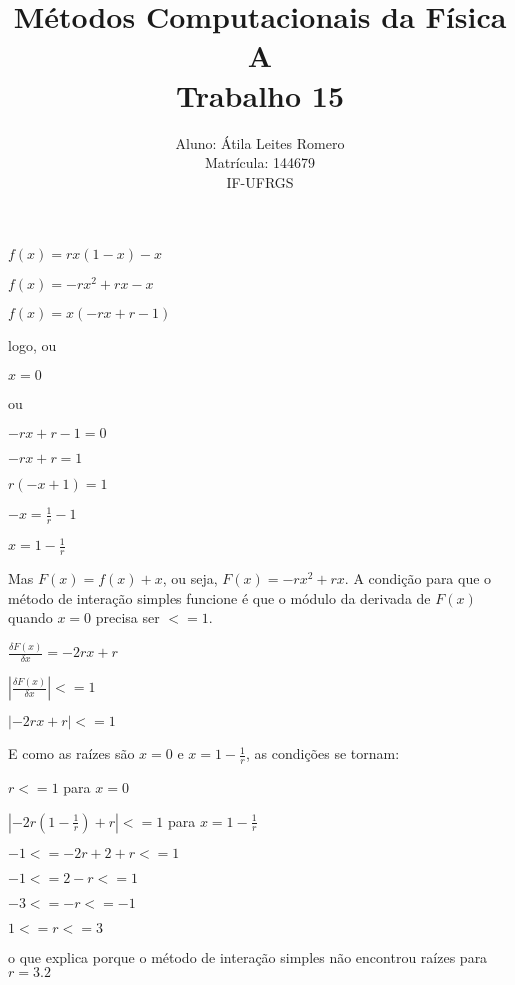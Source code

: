 \documentclass[brazilian,12pt,a4paper,final]{article}
\title{Métodos Computacionais da Física A \\ Trabalho 15}
\author{Aluno: Átila Leites Romero \\ Matrícula: 144679 \\ IF-UFRGS}
\begin{document}
\maketitle

$f(x) = rx(1-x)-x$

$f(x) = -rx^2 + rx -x $

$f(x) = x(-rx + r -1)$

logo, ou

$x = 0$

ou

$-rx + r -1 = 0$

$-rx + r = 1$

$r(-x + 1) = 1$

$-x = \frac{1}{r}-1$

$x = 1 - \frac{1}{r}$

Mas $F(x)= f(x)+x$, ou seja, $F(x) = -rx^2 + rx$. A condição para que o método
de interação simples funcione é que o módulo da derivada de $F(x)$ quando $x = 0$
precisa ser $<= 1$.

$\frac{\delta F(x)}{\delta x} = -2rx + r$

$|\frac{\delta F(x)}{\delta x}| <= 1$

$|-2rx + r| <= 1$

E como as raízes são $x = 0$ e $x = 1 - \frac{1}{r}$, as condições se tornam:

$r <= 1$ para $x = 0$

$|-2r(1 - \frac{1}{r}) + r| <= 1$ para $x = 1 - \frac{1}{r}$

$-1 <= -2r + 2 + r <= 1$

$-1 <= 2 - r <= 1$

$-3 <= - r <= -1 $

$1 <= r <= 3$

o que explica porque o método de interação simples não encontrou raízes
para $r=3.2$
\end{document}
